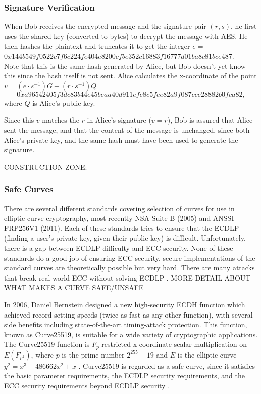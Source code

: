 \documentclass[12pt,a4paper]{article}
\begin{document}
\subsubsection{Signature Verification}
When Bob receives the encrypted message and the signature pair $(r,s)$, 
he first uses the shared key (converted to bytes) to decrypt the message with AES. 
He then hashes the plaintext and truncates it to get the integer $e =$ \\
{\footnotesize$0x144b549f0522c7f6c224fe404e8200cfbe352c16883f16777d01ba8c81bce487$}. \\
Note that this is the same hash generated by Alice, but Bob doesn't yet know this since the hash itself is not sent. 
Alice calculates the x-coordinate of the point $v = (e \cdot s^{-1})G + (r \cdot s^{-1})Q =$ \\
\begin{equation}
    0xa96542405f3dc83b44e45beaa40d911efe8c5fee82a9f087cce28882b0fca82,
\end{equation}
where $Q$ is Alice's public key. 

Since this $v$ matches the $r$ in Alice's signature ($v=r$), 
Bob is assured that Alice sent the message, and that the content of the message is unchanged, 
since both Alice's private key, and the same hash must have been used to generate the signature. 


CONSTRUCTION ZONE:
\subsubsection{Safe Curves} \label{Safe Curves}
There are several different standards covering selection of curves for use in elliptic-curve cryptography, 
most recently NSA Suite B (2005) and ANSSI FRP256V1 (2011). 
Each of these standards tries to ensure that the ECDLP (finding a user's private key, given their public key) is difficult. 
Unfortunately, there is a gap between ECDLP difficulty and ECC security. 
None of these standards do a good job of ensuring ECC security, 
secure implementations of the standard curves are theoretically possible but very hard. 
There are many attacks that break real-world ECC without solving ECDLP \cite{bernstein2013safecurves}. 
MORE DETAIL ABOUT WHAT MAKES A CURVE SAFE/UNSAFE

In 2006, Daniel Bernstein designed a new high-security ECDH function which achieved record setting speeds (twice as fast as any other function), 
with several side benefits including state-of-the-art timing-attack protection. 
This function, known as Curve25519, is suitable for a wide variety of cryptographic applications. 
The Curve25519 function is $F_p$-restricted x-coordinate scalar multiplication on $E(F_{p^2})$, 
where $p$ is the prime number $2^{255} - 19$ and $E$ is the elliptic curve $y^2 = x^3 + 486662x^2 + x$ \cite{10.1007/11745853_14}.
Curve25519 is regarded as a safe curve, since it satisfies the basic parameter requirements, the ECDLP security requirements, 
and the ECC security requirements beyond ECDLP security \cite{bernstein2013safecurves}.
\end{document}
